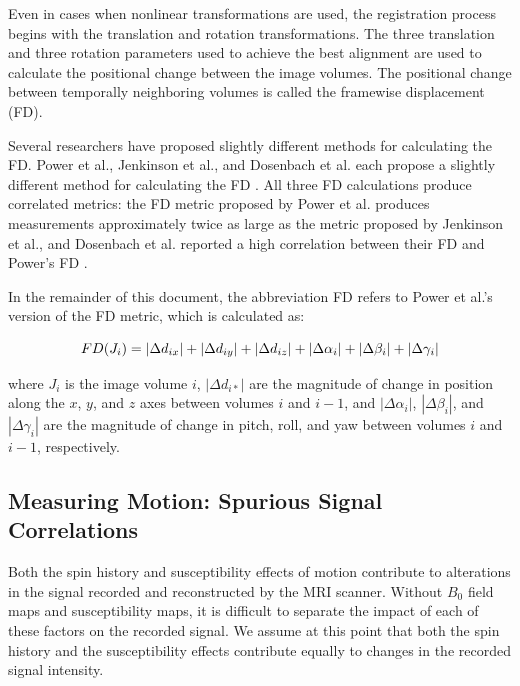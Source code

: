 Even in cases when nonlinear transformations are used, the registration process begins with the translation and rotation transformations. The three translation and three rotation parameters used to achieve the best alignment are used to calculate the positional change between the image volumes. The positional change between temporally neighboring volumes is called the framewise displacement (FD).  

Several researchers have proposed slightly different methods for calculating the FD. Power et al., Jenkinson et al., and Dosenbach et al. each propose a slightly different method for calculating the FD \cite{Power2012} \cite{Jenkinson2002} \cite{Dosenbach2017}. All three FD calculations produce correlated metrics: the FD metric proposed by Power et al. produces measurements approximately twice as large as the metric proposed by Jenkinson et al., and Dosenbach et al. reported a high correlation between their FD and Power’s FD \cite{Yan2013a} \cite{Dosenbach2017}. 

In the remainder of this document, the abbreviation FD refers to Power et al.'s version of the FD metric, which is calculated as:

\begin{equation}
FD(J_i) = | \Delta d_{ix} | + | \Delta d_{iy} | + | \Delta d_{iz} | \\ + | \Delta \alpha_i | + | \Delta \beta_i | + | \Delta \gamma_i |
\end{equation}

\noindent where $J_i$ is the image volume $i$, $| \Delta d_{i *} |$ are the magnitude of change in position along the $x$, $y$, and $z$ axes between volumes $i$ and $i-1$, and $| \Delta \alpha_i |$, $| \Delta \beta_i |$, and $| \Delta \gamma_i |$ are the magnitude of change in pitch, roll, and yaw between volumes $i$ and $i-1$, respectively.

\subsection{Measuring Motion: Spurious Signal Correlations}

Both the spin history and susceptibility effects of motion contribute to alterations in the signal recorded and reconstructed by the MRI scanner. Without $B_0$ field maps and susceptibility maps, it is difficult to separate the impact of each of these factors on the recorded signal. We assume at this point that both the spin history and the susceptibility effects contribute equally to changes in the recorded signal intensity.

